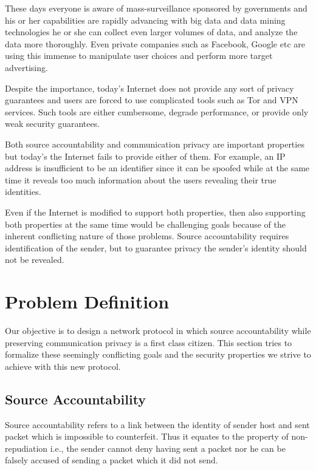 These days everyone is aware of mass-surveillance sponsored by governments and his or her capabilities are rapidly advancing with big data and data mining technologies he or she can collect even larger volumes of data, and analyze the data more thoroughly. Even private companies such as Facebook, Google etc are using this immense to manipulate user choices and perform more target advertising.

Despite the importance, today's Internet does not provide any sort of privacy guarantees and users are forced to use complicated tools such as Tor and VPN services. Such tools are either cumbersome, degrade performance, or provide only weak security guarantees. 

Both source accountability and communication privacy are important properties but today's the Internet fails to provide either of them. For example, an IP address is insufficient to be an identifier since it can be spoofed while at the same time it reveals too much information about the users revealing their true identities.

Even if the Internet is modified to support both properties, then also supporting both properties at the same time would be challenging goals because of the inherent conflicting nature of those problems. Source accountability requires identification of the sender, but to guarantee privacy the sender's identity should not be revealed.

\section{Problem Definition} \label{intro:prob}
Our objective is to design a network protocol in which source accountability while preserving communication privacy is a first class citizen. This section tries to formalize these seemingly conflicting goals and the security properties we strive to achieve with this new protocol.

\subsection{Source Accountability}
Source accountability refers to a link between the identity of sender host and sent packet which is impossible to counterfeit. Thus it equates to the property of non-repudiation i.e., the sender cannot deny having sent a packet nor he can be falsely accused of sending a packet which it did not send.

